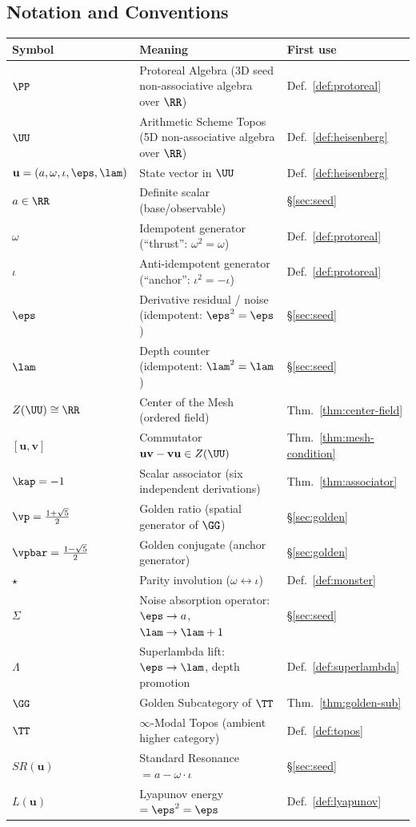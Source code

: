 \newpage

\subsection*{Notation and Conventions}

\begin{tabular}{@{}lll@{}}
\toprule
\textbf{Symbol} & \textbf{Meaning} & \textbf{First use} \\
\midrule
$\PP$ & Protoreal Algebra (3D seed non-associative algebra over $\RR$) & Def.~\ref{def:protoreal} \\
$\UU$ & Arithmetic Scheme Topos (5D non-associative algebra over $\RR$) & Def.~\ref{def:heisenberg} \\
$\mathbf{u} = (a, \omega, \iota, \eps, \lam)$ & State vector in $\UU$ & Def.~\ref{def:heisenberg} \\
$a \in \RR$ & Definite scalar (base/observable) & \S\ref{sec:seed} \\
$\omega$ & Idempotent generator (``thrust'': $\omega^2 = \omega$) & Def.~\ref{def:protoreal} \\
$\iota$ & Anti-idempotent generator (``anchor'': $\iota^2 = -\iota$) & Def.~\ref{def:protoreal} \\
$\eps$ & Derivative residual / noise (idempotent: $\eps^2 = \eps$) & \S\ref{sec:seed} \\
$\lam$ & Depth counter (idempotent: $\lam^2 = \lam$) & \S\ref{sec:seed} \\
$Z(\UU) \cong \RR$ & Center of the Mesh (ordered field) & Thm.~\ref{thm:center-field} \\
$[\mathbf{u}, \mathbf{v}]$ & Commutator $\mathbf{uv} - \mathbf{vu} \in Z(\UU)$ & Thm.~\ref{thm:mesh-condition} \\
$\kap = -1$ & Scalar associator (six independent derivations) & Thm.~\ref{thm:associator} \\
$\vp = \tfrac{1+\sqrt{5}}{2}$ & Golden ratio (spatial generator of $\GG$) & \S\ref{sec:golden} \\
$\vpbar = \tfrac{1-\sqrt{5}}{2}$ & Golden conjugate (anchor generator) & \S\ref{sec:golden} \\
$\star$ & Parity involution ($\omega \leftrightarrow \iota$) & Def.~\ref{def:monster} \\
$\Sigma$ & Noise absorption operator: $\eps \to a$, $\lam \to \lam+1$ & \S\ref{sec:seed} \\
$\Lambda$ & Superlambda lift: $\eps \to \lam$, depth promotion & Def.~\ref{def:superlambda} \\
$\GG$ & Golden Subcategory of $\TT$ & Thm.~\ref{thm:golden-sub} \\
$\TT$ & $\infty$-Modal Topos (ambient higher category) & Def.~\ref{def:topos} \\
$SR(\mathbf{u})$ & Standard Resonance $= a - \omega \cdot \iota$ & \S\ref{sec:seed} \\
$L(\mathbf{u})$ & Lyapunov energy $= \eps^2 = \eps$ & Def.~\ref{def:lyapunov} \\
\bottomrule
\end{tabular}

